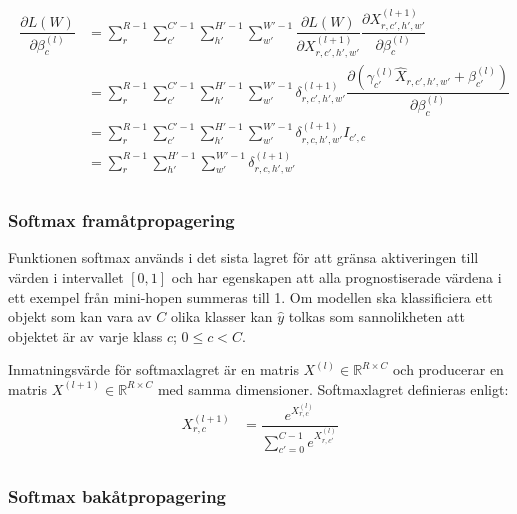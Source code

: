 \documentclass[a4paper,11pt,twoside]{article}
\newcommand*{\pd}[2]{\ensuremath{\dfrac{\partial #1}{\partial #2}}}
\begin{document}
\begin{align}
\begin{split}
	\pd{L(W)}{\beta^{(l)}_{c}}
		& = \sum^{R-1}_{r} \sum^{C'-1}_{c'} \sum^{H'-1}_{h'} \sum^{W'-1}_{w'} \pd{L(W)}{X^{(l+1)}_{r,c',h',w'}} \pd{X^{(l+1)}_{r,c',h',w'}}{\beta^{(l)}_{c}} \\
		& = \sum^{R-1}_{r} \sum^{C'-1}_{c'} \sum^{H'-1}_{h'} \sum^{W'-1}_{w'} \delta^{(l+1)}_{r,c',h',w'}  \pd{({\gamma_{c'}^{(l)} \hat{X}_{r,c',h',w'} + \beta_{c'}^{(l)}})}{\beta^{(l)}_{c}} \\
		& = \sum^{R-1}_{r} \sum^{C'-1}_{c'} \sum^{H'-1}_{h'} \sum^{W'-1}_{w'} \delta^{(l+1)}_{r,c,h',w'} I_{c',c}\\
		& = \sum^{R-1}_{r} \sum^{H'-1}_{h'} \sum^{W'-1}_{w'} \delta^{(l+1)}_{r,c,h',w'} \\
\end{split}
\end{align}

\subsubsection{Softmax framåtpropagering}
Funktionen softmax används i det sista lagret för att gränsa aktiveringen till värden i intervallet $[0,1]$ och har egenskapen att alla prognostiserade värdena i ett exempel från mini-hopen summeras till 1. Om modellen ska klassificiera ett objekt som kan vara av $C$ olika klasser kan $\hat{y}$ tolkas som sannolikheten att objektet är av varje klass $c$; $0 \leq c < C$. \cite{cs231n}

Inmatningsvärde för softmaxlagret är en matris $X^{(l)} \in \mathbb{R}^{R \times C}$ och producerar en matris $X^{(l+1)} \in \mathbb{R}^{R \times C}$ med samma dimensioner. Softmaxlagret definieras enligt:
\begin{equation}
\begin{split}
X^{(l+1)}_{r,c}
	& = \dfrac{e^{X^{(l)}_{r,c}}}{\sum^{C-1}_{c'=0}e^{X^{(l)}_{r,c'}}} \\
\end{split}
\end{equation}

\subsubsection{Softmax bakåtpropagering}
\end{document}
